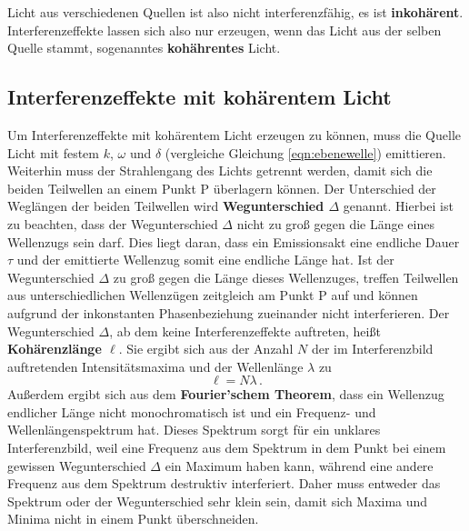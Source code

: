 Licht aus verschiedenen Quellen ist also nicht interferenzfähig, es ist \textbf{inkohärent}.
Interferenzeffekte lassen sich also nur erzeugen, wenn das Licht aus der selben Quelle stammt, 
sogenanntes \textbf{kohährentes} Licht.


\subsection{Interferenzeffekte mit kohärentem Licht}
\label{sec:kohärenz} 

Um Interferenzeffekte mit kohärentem Licht erzeugen zu können, muss die Quelle Licht mit 
festem $k$, $\omega$ und $\delta$ (vergleiche Gleichung \eqref{eqn:ebenewelle}) emittieren.
Weiterhin muss der Strahlengang des Lichts getrennt werden, damit sich die beiden Teilwellen 
an einem Punkt P überlagern können.
Der Unterschied der Weglängen der beiden Teilwellen wird \textbf{Wegunterschied $\Delta$} 
genannt.
Hierbei ist zu beachten, dass der Wegunterschied $\Delta$ nicht zu groß gegen die Länge eines 
Wellenzugs sein darf. Dies liegt daran, dass ein Emissionsakt eine endliche Dauer $\tau$ und der 
emittierte Wellenzug somit eine endliche Länge hat. Ist der Wegunterschied $\Delta$ zu groß
gegen die Länge dieses Wellenzuges, treffen Teilwellen aus unterschiedlichen Wellenzügen 
zeitgleich am Punkt P auf und können aufgrund der inkonstanten Phasenbeziehung zueinander nicht 
interferieren.
Der Wegunterschied $\Delta$, ab dem keine Interferenzeffekte auftreten, heißt \textbf{
	Kohärenzlänge $\ell$}. Sie ergibt sich aus der Anzahl $N$ der im Interferenzbild 
auftretenden Intensitätsmaxima und der Wellenlänge $\lambda$ zu 
\begin{equation}
	\ell = N \lambda \, \mathrm{.}
\end{equation}
Außerdem ergibt sich aus dem \textbf{Fourier'schem Theorem}, dass ein Wellenzug endlicher 
Länge nicht monochromatisch ist und ein Frequenz- und Wellenlängenspektrum hat. Dieses 
Spektrum sorgt für ein unklares Interferenzbild, weil eine Frequenz aus dem Spektrum in dem 
Punkt bei einem gewissen Wegunterschied $\Delta$ ein Maximum haben kann, während eine andere
Frequenz aus dem Spektrum destruktiv interferiert. Daher muss entweder das Spektrum oder der
Wegunterschied sehr klein sein, damit sich Maxima und Minima nicht in einem Punkt überschneiden.


